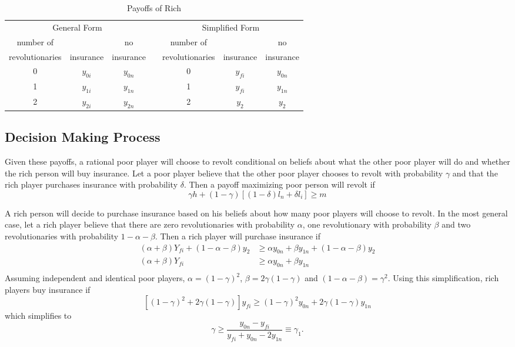 \documentclass[12pt]{article}
\begin{document}
	\begin{table}[!htbp]
		\caption{Payoffs of Rich}
		\label{rpayoffs}
		\centering
		\begin{tabular}{|c||c|c|c|c||c|c|}
			\multicolumn{3}{c}{General Form} &
			\multicolumn{1}{c}{} &
			\multicolumn{3}{c}{Simplified Form}\\
			\cline{1-3}\cline{5-7}
			number of & & no & & number of & & no\\
			revolutionaries & insurance & insurance && revolutionaries & 
			insurance & insurance\\
			\cline{1-3}\cline{5-7}
			0 & $y_{0i}$ & $y_{0n}$ && 0 & $y_{fi}$ & $y_{0n}$\\
			\cline{1-3}\cline{5-7}
			1 & $y_{1i}$ & $y_{1n}$ && 1 & $y_{fi}$ & $y_{1n}$\\
			\cline{1-3}\cline{5-7}
			2 & $y_{2i}$ & $y_{2n}$ && 2 & $y_2$ & $y_2$\\
			\cline{1-3}\cline{5-7}
		\end{tabular}
	\end{table}
	
	\subsection{Decision Making Process}
	Given these payoffs, a rational poor player will choose to revolt 
	conditional on beliefs about what the other poor player will do and whether 
	the rich person will buy insurance. Let a poor player believe that the 
	other poor player chooses to revolt with probability $\gamma$ and that the 
	rich player purchases insurance with probability $\delta$. Then a payoff 
	maximizing poor person will revolt if
	$$\gamma h + (1-\gamma)\left[ (1-\delta)l_n + \delta l_i \right] \geq m $$
	
	A rich person will decide to purchase insurance based on his beliefs about 
	how many poor players will choose to revolt. In the most general case, let 
	a rich player believe that there are zero revolutionaries with probability 
	$\alpha$, one revolutionary with probability $\beta$ and two 
	revolutionaries with probability $1-\alpha-\beta$. Then a rich player will 
	purchase insurance if
	\begin{align*}
		(\alpha+\beta)Y_{fi} + (1-\alpha-\beta)y_2 &\geq \alpha y_{0n} + \beta 
		y_{1n} + (1-\alpha-\beta)y_2\\
		(\alpha+\beta)Y_{fi} &\geq \alpha y_{0n} + \beta y_{1n}\\
	\end{align*}
	Assuming independent and identical poor players, $\alpha=(1-\gamma)^2$, 
	$\beta=2\gamma(1-\gamma)$ and $(1-\alpha-\beta)=\gamma^2$. Using this 
	simplification, rich players buy insurance if
	$$ \left[(1-\gamma)^2 + 2\gamma(1-\gamma)\right]y_{fi} \geq 
	(1-\gamma)^2y_{0n} + 2\gamma(1-\gamma)y_{1n} $$
	which simplifies to
	\begin{equation}\tag{I}
		\label{I}
		\gamma \geq \frac{y_{0n} - y_{fi}}{y_{fi} + y_{0n} -2y_{1n}} \equiv 
		\gamma_1.
	\end{equation}
	
\end{document}
